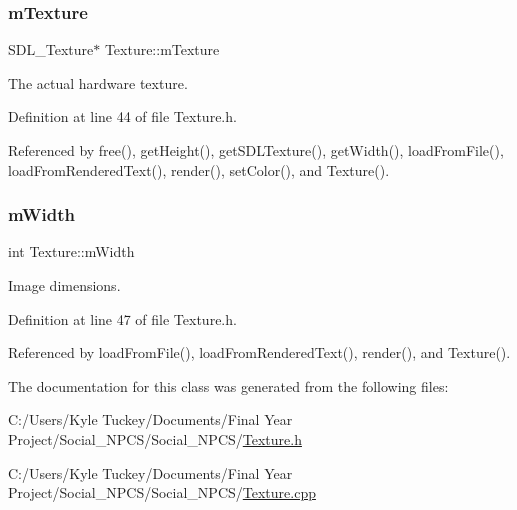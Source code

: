 \subsubsection{\texorpdfstring{m\+Texture}{mTexture}}
{\footnotesize\ttfamily S\+D\+L\+\_\+\+Texture$\ast$ Texture\+::m\+Texture\hspace{0.3cm}{\ttfamily [private]}}



The actual hardware texture. 



Definition at line 44 of file Texture.\+h.



Referenced by free(), get\+Height(), get\+S\+D\+L\+Texture(), get\+Width(), load\+From\+File(), load\+From\+Rendered\+Text(), render(), set\+Color(), and Texture().

\mbox{\label{class_texture_a0e007f4b4f1a314e5b0dae1402a13afb}} 
\subsubsection{\texorpdfstring{m\+Width}{mWidth}}
{\footnotesize\ttfamily int Texture\+::m\+Width\hspace{0.3cm}{\ttfamily [private]}}



Image dimensions. 



Definition at line 47 of file Texture.\+h.



Referenced by load\+From\+File(), load\+From\+Rendered\+Text(), render(), and Texture().



The documentation for this class was generated from the following files\+:\begin{DoxyCompactItemize}
\item 
C\+:/\+Users/\+Kyle Tuckey/\+Documents/\+Final Year Project/\+Social\+\_\+\+N\+P\+C\+S/\+Social\+\_\+\+N\+P\+C\+S/\hyperlink{_texture_8h}{Texture.\+h}\item 
C\+:/\+Users/\+Kyle Tuckey/\+Documents/\+Final Year Project/\+Social\+\_\+\+N\+P\+C\+S/\+Social\+\_\+\+N\+P\+C\+S/\hyperlink{_texture_8cpp}{Texture.\+cpp}\end{DoxyCompactItemize}
